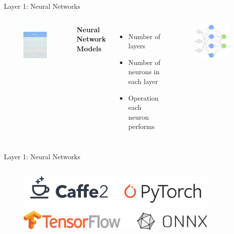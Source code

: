 \documentclass[xcolor=dvipsnames]{beamer}
\begin{document}
\begin{frame}{Layer 1: Neural Networks}

\begin{columns}

\begin{figure}
    \centering
    \includegraphics[width=3.5cm]{images/models.pdf}
    \label{fig:inference-stack-models}
\end{figure}


\textbf{Neural Network Models}

\begin{itemize}
    \item Number of layers
    \item Number of neurons in each layer
    \item Operation each neuron performs
\end{itemize}

\begin{figure}
    \centering
    \includegraphics[width=5.5cm]{images/neural_network.pdf}
\end{figure}

\end{columns}


\end{frame}


\begin{frame}{Layer 1: Neural Networks}
\vspace{0.2cm}

\inputminted[bgcolor=bg, fontfamily=cmss]{python}{images/mini_model.py}

\begin{figure}
    \centering
    \vspace{-1cm}
    \includegraphics[width=10cm]{images/lgoos.pdf}
\end{figure}
\end{frame}
\end{document}
